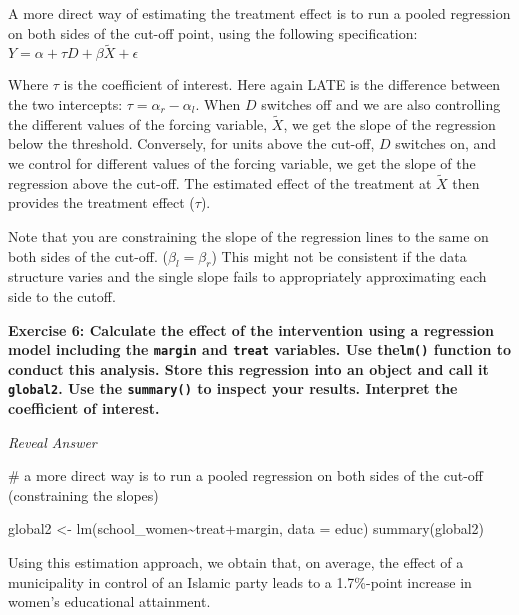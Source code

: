 \documentclass[
  letterpaper,
  DIV=11,
  numbers=noendperiod]{scrreprt}
\newenvironment{Shaded}{\begin{snugshade}}{\end{snugshade}}
\newcommand{\AttributeTok}[1]{\textcolor[rgb]{0.40,0.45,0.13}{#1}}
\newcommand{\CommentTok}[1]{\textcolor[rgb]{0.37,0.37,0.37}{#1}}
\newcommand{\FunctionTok}[1]{\textcolor[rgb]{0.28,0.35,0.67}{#1}}
\newcommand{\NormalTok}[1]{\textcolor[rgb]{0.00,0.23,0.31}{#1}}
\newcommand{\OtherTok}[1]{\textcolor[rgb]{0.00,0.23,0.31}{#1}}
\newcommand{\SpecialCharTok}[1]{\textcolor[rgb]{0.37,0.37,0.37}{#1}}
\begin{document}
\hfill\break

A more direct way of estimating the treatment effect is to run a pooled
regression on both sides of the cut-off point, using the following
specification: \(Y = \alpha + \tau D + \beta \tilde{X} + \epsilon\)

Where \(\tau\) is the coefficient of interest. Here again LATE is the
difference between the two intercepts: \(\tau = \alpha_r -\alpha_l\).
When \(D\) switches off and we are also controlling the different values
of the forcing variable, \(\tilde{X}\), we get the slope of the
regression below the threshold. Conversely, for units above the cut-off,
\(D\) switches on, and we control for different values of the forcing
variable, we get the slope of the regression above the cut-off. The
estimated effect of the treatment at \(\tilde{X}\) then provides the
treatment effect (\(\tau\)).

Note that you are constraining the slope of the regression lines to the
same on both sides of the cut-off. (\(\beta_l = \beta_r\)) This might
not be consistent if the data structure varies and the single slope
fails to appropriately approximating each side to the cutoff.

\textbf{Exercise 6: Calculate the effect of the intervention using a
regression model including the \texttt{margin} and \texttt{treat}
variables. Use the\texttt{lm()} function to conduct this analysis. Store
this regression into an object and call it \texttt{global2}. Use the
\texttt{summary()} to inspect your results. Interpret the coefficient of
interest.}

\hfill\break

\emph{Reveal Answer}

\begin{Shaded}
\begin{Highlighting}[]
\CommentTok{\# a more direct way is to run a pooled regression on both sides of the cut{-}off (constraining the slopes)}

\NormalTok{global2 }\OtherTok{\textless{}{-}} \FunctionTok{lm}\NormalTok{(school\_women}\SpecialCharTok{\textasciitilde{}}\NormalTok{treat}\SpecialCharTok{+}\NormalTok{margin, }\AttributeTok{data =}\NormalTok{ educ)}
\FunctionTok{summary}\NormalTok{(global2)}
\end{Highlighting}
\end{Shaded}

Using this estimation approach, we obtain that, on average, the effect
of a municipality in control of an Islamic party leads to a 1.7\%-point
increase in women's educational attainment.
\end{document}
